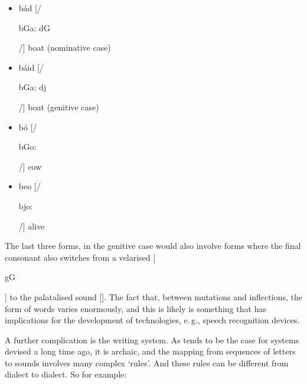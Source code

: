 \begin{multicols}{2}
\begin{itemize}
\item bád    [/\begin{IPA}b\super Ga: d\super G\end{IPA}/]  boat (nominative case)
\item báid   [/\begin{IPA}b\super Ga: d\super j\end{IPA}/]  boat (genitive case)
\end{itemize}


\begin{itemize} 
\item bó [/\begin{IPA}b\super Go: \end{IPA}/] cow 
\item beo [/\begin{IPA}b\super jo: \end{IPA}/] alive  
\end{itemize}  


The last three forms, in the genitive case would also involve forms where the final consonant also switches from a velarised [\begin{IPA}g\super G\end{IPA}] to the palatalised sound []. The fact that, between mutations and inflections, the form of words varies enormously, and this is likely is something that has implications for the development of technologies, e.\,g., speech recognition devices.

A further complication is the writing system. As tends to be the case for systems devised a long time ago, it is archaic, and the mapping from sequences of letters to sounds involves many complex ‘rules’. And these rules can be different from dialect to dialect. So for example:


\end{multicols}
